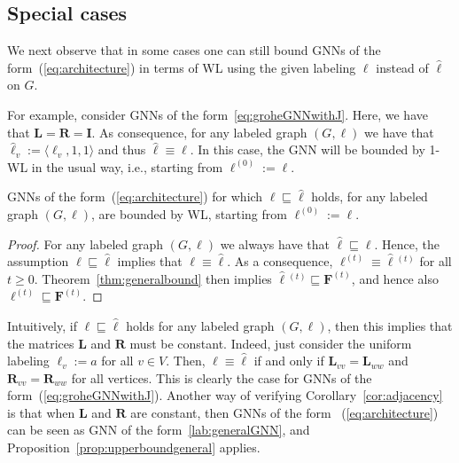\subsection{Special cases}\label{subsec:specialcases}
We next observe that in some cases one can still bound  GNNs of the form~(\ref{eq:architecture}) in terms of WL using the given labeling $\pmb{\ell}$ instead of
$\hat{\pmb{\ell}}$ on $G$. 

%
For example, consider GNNs of the form~\ref{eq:groheGNNwithJ}. Here, we have that $\mathbf{L}=\mathbf{R}=\mathbf{I}$. As consequence, for any labeled graph $(G,\pmb{\ell})$
we have that  $\hat{\pmb{\ell}}_v:=\langle \pmb{\ell}_v,1,1\rangle$ and thus $\hat{\pmb{\ell}}\equiv\pmb{\ell}$. In this case, the GNN will be bounded by 1-WL in the usual way, i.e., starting from $\pmb{\ell}^{(0)}:=\pmb{\ell}$. 

\begin{corollary}\label{cor:adjacency}
GNNs of the form~(\ref{eq:architecture}) for which 
$\pmb{\ell}\sqsubseteq\hat{\pmb{\ell}}$ holds, for any labeled graph $(G,\pmb{\ell})$, are bounded by WL, starting from $\pmb{\ell}^{(0)}:=\pmb{\ell}$. 
\end{corollary}
\begin{proof}
For any labeled graph $(G,\pmb{\ell})$ we always have that $\hat{\pmb{\ell}}\sqsubseteq \pmb{\ell}$. Hence, the assumption $\pmb{\ell}\sqsubseteq\hat{\pmb{\ell}}$ implies that $\pmb{\ell}\equiv\hat{\pmb{\ell}}$. As a consequence, $\pmb{\ell}^{(t)}\equiv \hat{\pmb{\ell}}{}^{(t)}$ for all $t\geq 0$. Theorem~\ref{thm:generalbound} then implies $\hat{\pmb{\ell}}{}^{(t)}\sqsubseteq \mathbf{F}^{(t)}$, and hence also $\pmb{\ell}^{(t)}\sqsubseteq\mathbf{F}^{(t)}$.
\end{proof}
Intuitively, if $\pmb{\ell}\sqsubseteq\hat{\pmb{\ell}}$ holds for any labeled graph $(G,\pmb{\ell})$, then this implies that the matrices $\mathbf{L}$ and $\mathbf{R}$ must
be constant. Indeed, just consider the uniform labeling $\pmb{\ell}_v:=a$ for all $v\in V$. Then,
$\pmb{\ell}\equiv\hat{\pmb{\ell}}$ if and only if $\mathbf{L}_{vv}=\mathbf{L}_{ww}$
and $\mathbf{R}_{vv}=\mathbf{R}_{ww}$ for all vertices.
This is clearly the case for GNNs of the form~(\ref{eq:groheGNNwithJ}).
Another way of verifying Corollary~\ref{cor:adjacency} is that when $\mathbf{L}$ and $\mathbf{R}$ are constant, then GNNs of the form
~(\ref{eq:architecture}) can be seen as GNN of the form~\ref{lab:generalGNN}, and Proposition~\ref{prop:upperboundgeneral} applies.

